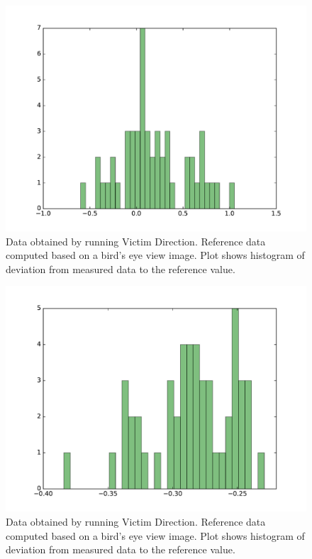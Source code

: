 \documentclass[a4paper,parskip,headheight=38pt]{scrartcl} %
\begin{document}
\begin{figure}[t]
\includegraphics[width=\textwidth]{victimdirectionbadplot.pdf}
\caption{Data obtained by running Victim Direction. Reference data computed
based on a bird's eye view image. Plot shows histogram of deviation from
measured data to the reference value.}
\label{fig:vddatabad}
\end{figure}
\begin{figure}[t]
\includegraphics[width=\textwidth]{victimdirectiongoodplot.pdf}
\caption{Data obtained by running Victim Direction. Reference data computed
based on a bird's eye view image. Plot shows histogram of deviation from
measured data to the reference value.}
\label{fig:vddatagood}
\end{figure}
\end{document}
